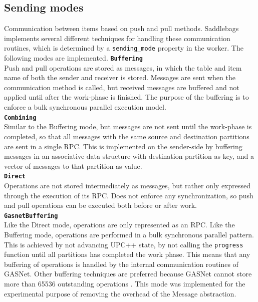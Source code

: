 \documentclass{uit-report}
\begin{document}
\subsection{Sending modes} \label{section:sendingmodes}
Communication between items based on push and pull methods. Saddlebags implements several different techniques for handling these communication routines, which is determined by a \texttt{sending\_mode} property in the worker. The following modes are implemented.
\newpage
\hspace{4ex} \textbf{\texttt{Buffering}}
\\
Push and pull operations are stored as messages, in which the table and item name of both the sender and receiver is stored. Messages are sent when the communication method is called, but received messages are buffered and not applied until after the work-phase is finished. The purpose of the buffering is to enforce a bulk synchronous parallel execution model.\\

\hspace{4ex} \textbf{\texttt{Combining}}
\\
Similar to the Buffering mode, but messages are not sent until the work-phase is completed, so that all messages with the same source and destination partitions are sent in a single RPC. This is implemented on the sender-side by buffering messages in an associative data structure with destination partition as key, and a vector of messages to that partition as value.\\

\hspace{4ex} \textbf{\texttt{Direct}}
\\
Operations are not stored intermediately as messages, but rather only expressed through the execution of its RPC. Does not enforce any synchronization, so push and pull operations can be executed both before or after work. \\

\hspace{4ex} \textbf{\texttt{GasnetBuffering}}
\\
Like the Direct mode, operations are only represented as an RPC. Like the Buffering mode, operations are performed in a bulk synchronous parallel pattern. This is achieved by not advancing UPC++ state, by not calling the \texttt{progress} function until all partitions has completed the work phase. This means that any buffering of operations is handled by the internal communication routines of GASNet. Other buffering techniques are preferred because GASNet cannot store more than 65536 outstanding operations \cite{gasnetpresentation}. This mode was implemented for the experimental purpose of removing the overhead of the Message abstraction.
\end{document}
